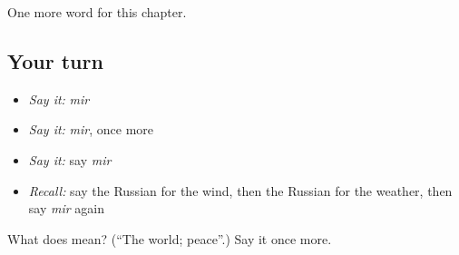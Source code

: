 \begin{grammarlens}[title={What you've built}]
One more word for this chapter.
\end{grammarlens}

\subsection*{Your turn}
\begin{itemize}
\raggedright
  \item \emph{Say it:} \emph{mir}
  \item \emph{Say it:} \emph{mir}, once more
  \item \emph{Say it:} say \emph{mir}
  \item \emph{Recall:} say the Russian for the wind, then the Russian for the weather, then say \emph{mir} again
\end{itemize}

\begin{tcolorbox}[breakable,colback=teal!4,colframe=teal!35!black,title={Before you move on}]
What does  mean? (\textquotedblleft{}The world; peace\textquotedblright{}.) Say it once more.
\end{tcolorbox}
